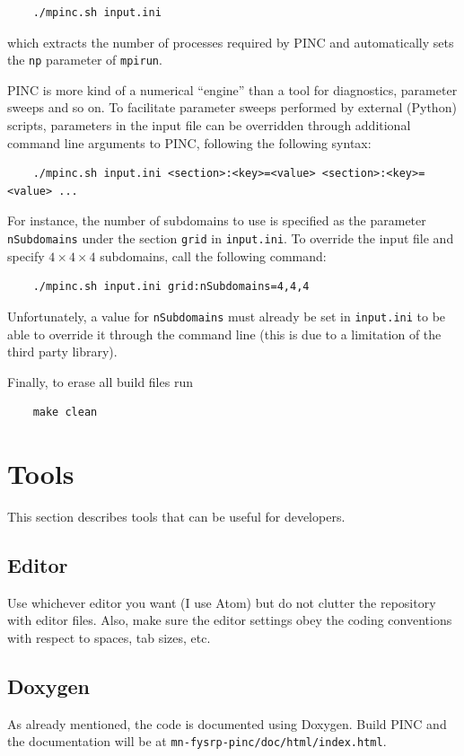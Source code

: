 \documentclass[10pt,a4paper]{article}
\begin{document}
\begin{verbatim}
	./mpinc.sh input.ini
\end{verbatim}
which extracts the number of processes required by PINC and automatically sets the \verb$np$ parameter of \verb$mpirun$.

PINC is more kind of a numerical ``engine'' than a tool for diagnostics, parameter sweeps and so on. To facilitate parameter sweeps performed by external (Python) scripts, parameters in the input file can be overridden through additional command line arguments to PINC, following the following syntax:
\begin{verbatim}
	./mpinc.sh input.ini <section>:<key>=<value> <section>:<key>=<value> ...
\end{verbatim}
For instance, the number of subdomains to use is specified as the parameter \verb$nSubdomains$ under the section \verb$grid$ in \verb$input.ini$. To override the input file and specify $4\times 4\times 4$ subdomains, call the following command:

\begin{verbatim}
	./mpinc.sh input.ini grid:nSubdomains=4,4,4
\end{verbatim}
Unfortunately, a value for \verb$nSubdomains$ must already be set in \verb$input.ini$ to be able to override it through the command line (this is due to a limitation of the third party library).

Finally, to erase all build files run
\begin{verbatim}
	make clean
\end{verbatim}

\section{Tools}
This section describes tools that can be useful for developers.

\subsection{Editor}
Use whichever editor you want (I use Atom) but do not clutter the repository with editor files. Also, make sure the editor settings obey the coding conventions with respect to spaces, tab sizes, etc.

\subsection{Doxygen}
As already mentioned, the code is documented using Doxygen. Build PINC and the documentation will be at \verb$mn-fysrp-pinc/doc/html/index.html$.
\end{document}

